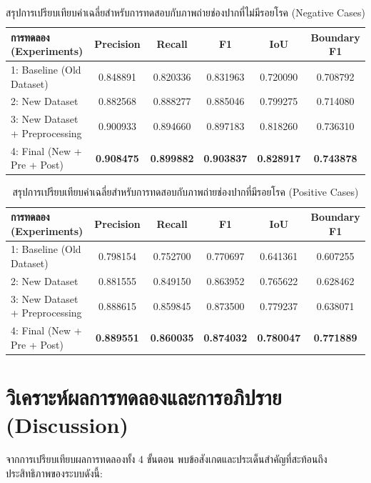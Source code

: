 \begin{table}[H]
\centering
\caption{สรุปการเปรียบเทียบค่าเฉลี่ยสำหรับการทดสอบกับภาพถ่ายช่องปากที่ไม่มีรอยโรค (Negative Cases)}
\label{tab:ablation_negative_summary}
\begin{tabular}{|l|c|c|c|c|c|}
\hline
\textbf{การทดลอง (Experiments)} & \textbf{Precision} & \textbf{Recall} & \textbf{F1} & \textbf{IoU} & \textbf{Boundary F1} \\ \hline
1: Baseline (Old Dataset) & 0.848891 & 0.820336 & 0.831963 & 0.720090 & 0.708792 \\
2: New Dataset & 0.882568 & 0.888277 & 0.885046 & 0.799275 & 0.714080 \\
3: New Dataset + Preprocessing & 0.900933 & 0.894660 & 0.897183 & 0.818260 & 0.736310 \\
4: Final (New + Pre + Post) & \textbf{0.908475} & \textbf{0.899882} & \textbf{0.903837} & \textbf{0.828917} & \textbf{0.743878} \\ \hline
\end{tabular}
\end{table}

\begin{table}[H]
\centering
\caption{สรุปการเปรียบเทียบค่าเฉลี่ยสำหรับการทดสอบกับภาพถ่ายช่องปากที่มีรอยโรค (Positive Cases)}
\label{tab:ablation_positive_summary}
\begin{tabular}{|l|c|c|c|c|c|}
\hline
\textbf{การทดลอง (Experiments)} & \textbf{Precision} & \textbf{Recall} & \textbf{F1} & \textbf{IoU} & \textbf{Boundary F1} \\ \hline
1: Baseline (Old Dataset) & 0.798154 & 0.752700 & 0.770697 & 0.641361 & 0.607255 \\
2: New Dataset & 0.881555 & 0.849150 & 0.863952 & 0.765622 & 0.628462 \\
3: New Dataset + Preprocessing & 0.888615 & 0.859845 & 0.873500 & 0.779237 & 0.638071 \\
4: Final (New + Pre + Post) & \textbf{0.889551} & \textbf{0.860035} & \textbf{0.874032} & \textbf{0.780047} & \textbf{0.771889} \\ \hline
\end{tabular}
\end{table}

\section{วิเคราะห์ผลการทดลองและการอภิปราย (Discussion)}
จากการเปรียบเทียบผลการทดลองทั้ง 4 ขั้นตอน พบข้อสังเกตและประเด็นสำคัญที่สะท้อนถึงประสิทธิภาพของระบบดังนี้:

